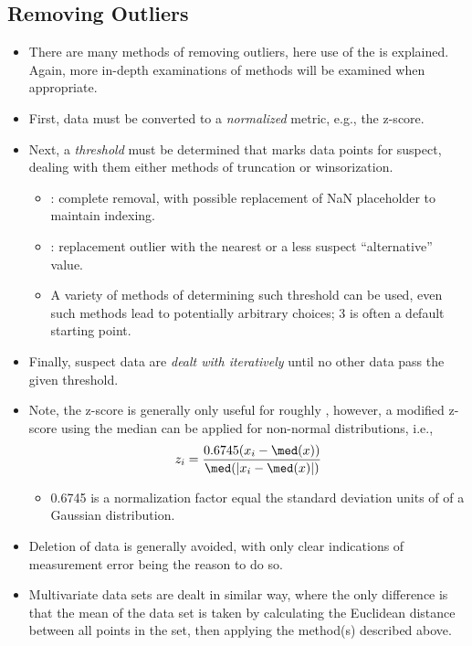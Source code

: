 \begin{itemize}
  \subsection{Removing Outliers}
  \begin{itemize}
    \item There are many methods of removing outliers, here use of the \hyperref[Subsection: Z-Score Standardization]{} is explained. Again, more in-depth examinations of methods will be examined when appropriate.
    \item First, data must be converted to a \emph{normalized} metric, e.g., the z-score.
    \item Next, a \emph{threshold} must be determined that marks data points for suspect, dealing with them either methods of truncation or winsorization.
      \begin{itemize}
        \item {}: complete removal, with possible replacement of NaN placeholder to maintain indexing.
        \item {}: replacement outlier with the nearest or a less suspect ``alternative'' value.
        \item A variety of methods of determining such threshold can be used, even such methods lead to potentially arbitrary choices; 3 is often a default starting point.
      \end{itemize}
    \item Finally, suspect data are \emph{dealt with iteratively} until no other data pass the given threshold.
    \item Note, the z-score is generally only useful for roughly \hyperref[Subsection: Primer: Probability Distributions]{}, however, a modified z-score using the median can be applied for non-normal distributions, i.e., 
    \[%
    z_i = \frac{0.6745(x_i-\med(x))}{\med(|x_i-\med(x)|)}
    \]%
    \begin{itemize}
      \item 0.6745 is a normalization factor equal the standard deviation units of \hyperref[boxplot]{} of a Gaussian distribution.
    \end{itemize}
    \item Deletion of data is generally avoided, with only clear indications of measurement error being the reason to do so. 
    \item Multivariate data sets are dealt in similar way, where the only difference is that the mean of the data set is taken by calculating the Euclidean distance between all points in the set, then applying the method(s) described above.
  \end{itemize}

\end{itemize}
